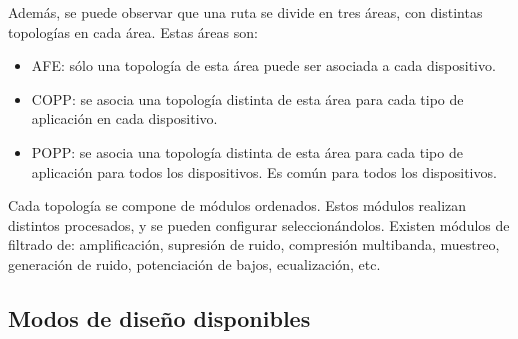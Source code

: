 Además, se puede observar que una ruta se divide en tres áreas, con distintas topologías en cada área. Estas áreas son:
\begin{itemize}
	\item{\gls{AFE}: sólo una topología de esta área puede ser asociada a cada dispositivo.}
	\item{\gls{COPP}: se asocia una topología distinta de esta área para cada tipo de aplicación en cada dispositivo.}
	\item{\gls{POPP}: se asocia una topología distinta de esta área para cada tipo de aplicación para todos los dispositivos. Es común para todos los dispositivos.}
\end{itemize}

Cada topología se compone de módulos ordenados. Estos módulos realizan distintos procesados, y se pueden configurar seleccionándolos. Existen módulos de filtrado de: amplificación, supresión de ruido, compresión multibanda, muestreo, generación de ruido, potenciación de bajos, ecualización, etc.

\subsection{Modos de diseño disponibles}

 
